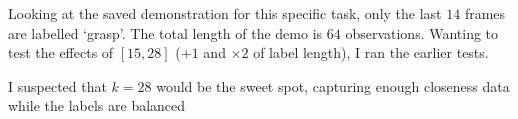 Looking at the saved demonstration for this specific task, only the last $14$ frames are labelled `grasp'. The total length of the demo is $64$ observations. Wanting to test the effects of \(\left[15, 28\right]\) ($+ 1$ and $\times 2$ of label length), I ran the earlier tests.


I suspected that \(k = 28\) would be the sweet spot, capturing enough closeness data while the labels are balanced

